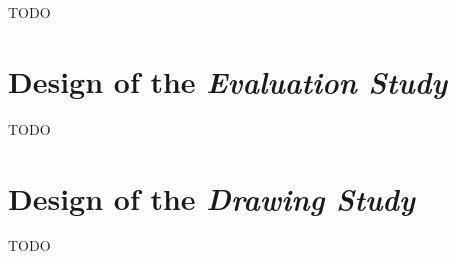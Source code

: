 TODO

\section{Design of the \textit{Evaluation Study}}
TODO

\section{Design of the \textit{Drawing Study}}
TODO